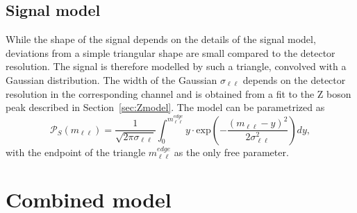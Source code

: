 \subsection{Signal model}
While the shape of the signal depends on the details of the signal model, deviations from a simple triangular shape are small compared to the detector resolution. The signal is therefore modelled by such a triangle, convolved with a Gaussian distribution. The width of the Gaussian $\sigma_{\ell\ell}$ depends on the detector resolution in the corresponding channel and is obtained from a fit to the Z boson peak described in Section~\ref{sec:Zmodel}. The model can be parametrized as
\begin{equation*}
 {\mathcal{P}}_{S}(m_{\ell\ell}) = \frac{1}{\sqrt{2\pi\sigma_{\ell\ell}}} \int_{0}^{m_{\ell\ell}^{edge}} y \cdot \textrm{exp}\left( -\frac{(m_{\ell\ell}-y)^2}{2\sigma_{\ell\ell}^{2}}\right) dy,
\end{equation*}
with the endpoint of the triangle $m_{\ell\ell}^{edge}$ as the only free parameter.


\section{Combined model}

